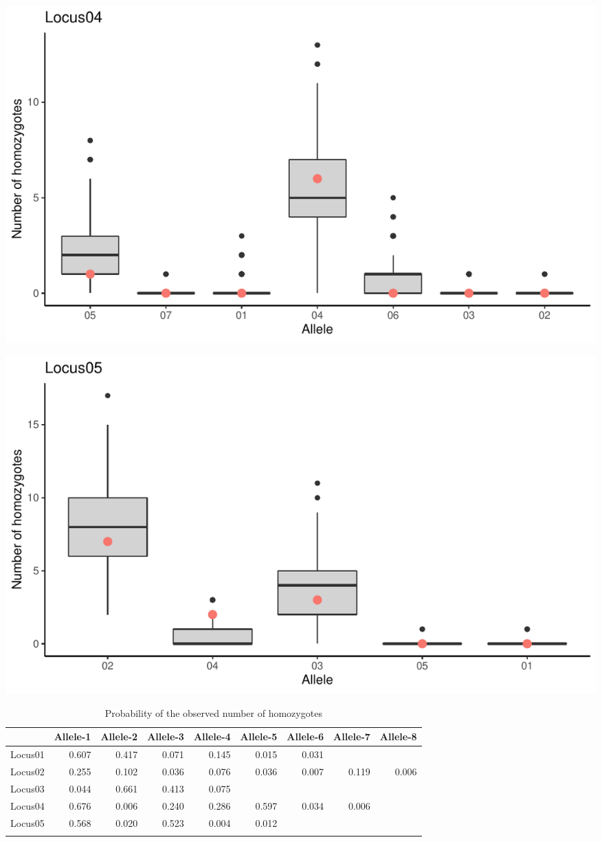 \documentclass[a4paper]{scrartcl}\usepackage[]{graphicx}\usepackage[]{color}
\makeatletter
\def\maxwidth{ %
  \ifdim\Gin@nat@width>\linewidth
    \linewidth
  \else
    \Gin@nat@width
  \fi
}
\newenvironment{knitrout}{}{} %
\makeatother
\begin{document}
\begin{knitrout}
\includegraphics[width=\maxwidth]{PopGenReport-null_all-4} 

\includegraphics[width=\maxwidth]{PopGenReport-null_all-5} 

\end{knitrout}

\begin{table}[ht]
\centering
\begin{tabular}{rrrrrrrrr}
  \hline
 & Allele-1 & Allele-2 & Allele-3 & Allele-4 & Allele-5 & Allele-6 & Allele-7 & Allele-8 \\ 
  \hline
Locus01 & 0.607 & 0.417 & 0.071 & 0.145 & 0.015 & 0.031 &  &  \\ 
   \rowcolor[gray]{0.9} Locus02 & 0.255 & 0.102 & 0.036 & 0.076 & 0.036 & 0.007 & 0.119 & 0.006 \\ 
  Locus03 & 0.044 & 0.661 & 0.413 & 0.075 &  &  &  &  \\ 
   \rowcolor[gray]{0.9} Locus04 & 0.676 & 0.006 & 0.240 & 0.286 & 0.597 & 0.034 & 0.006 &  \\ 
  Locus05 & 0.568 & 0.020 & 0.523 & 0.004 & 0.012 &  &  &  \\ 
   \rowcolor[gray]{0.9}  \hline
\end{tabular}
\caption{Probability of the observed number of homozygotes} 
\end{table}
\end{document}
